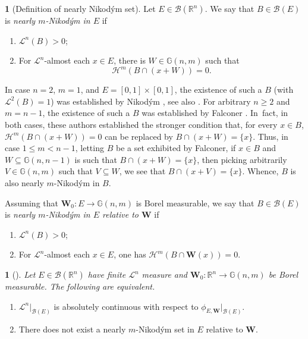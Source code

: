 \documentclass[11pt]{article}
\newcounter{cdrthm}[section]
\theoremstyle{definition}
\theoremstyle{jepanonymous}
\newtheorem{jepempty}[cdrthm]{}
\newenvironment{enonce}[2][remark]{\begin{jepempty}[#2]}{\end{jepempty}}
\theoremstyle{plain}
\newenvironment{Empty}[2][\null]{%
\begin{enonce}[remark]{#1}#2}
{\end{enonce}}
\newcommand{\R}{\mathbb{R}}
\newcommand{\Rn}{\R^n}
\newcommand{\calB}{\mathscr{B}}
\newcommand{\calH}{\mathscr{H}}
\newcommand{\calL}{\mathscr{L}}
\newcommand{\bW}{{\boldsymbol{W}}}
\newcommand{\bG}{\mathbb{G}}
\let\subset\subseteq
\begin{document}
\begin{Empty}[Definition of nearly Nikod\'ym set]
Let $E \in \calB(\Rn)$. We say that $B \in \calB(E)$ is \emph{nearly $m$-Nikod\'ym in $E$} if
\begin{enumerate}
\item $\calL^n(B) > 0$;
\item For $\calL^n$-almost each $x \in E$, there is $W \in \bG(n,m)$ such that
\[
\calH^m\left(B \cap (x+W) \right) = 0.
\]
\end{enumerate}
\par
In case $n=2$, $m=1$, and $E=[0,1] \times [0,1]$, the existence of such a $B$ (with $\calL^2(B)=1$) was established by Nikod\'ym \cite{NIK.27}, see also \cite[Chap.\,8]{GUZMAN.1981}.
For arbitrary $n \geq 2$ and $m=n-1$, the existence of such a $B$ was established by Falconer \cite{FAL.86}.
In~fact, in both cases, these authors established the stronger condition that, for every $x \in B$, $\calH^m(B \cap (x+W))=0$ can be replaced by $B \cap (x+W) = \{x\}$.
Thus, in case $1 \leq m< n-1$, letting $B$ be a set exhibited by Falconer, if $x \in B$ and $W \subset \bG(n,n-1)$ is such that $B \cap (x+W) = \{x\}$, then picking arbitrarily $V \in \bG(n,m)$ such that $V \subset W$, we see that $B \cap (x+V)=\{x\}$.
Whence, $B$ is also nearly $m$-Nikod\'ym in $B$.
\par
Assuming that $\bW_0: E \to \bG(n,m)$ is Borel measurable, we say that $B \in \calB(E)$ is \emph{nearly $m$-Nikod\'ym in $E$ relative to $\bW$} if
\begin{enumerate}
\item $\calL^n(B) > 0$;
\item For $\calL^n$-almost each $x \in E$, one has $\calH^m\left(B \cap \bW(x) \right) = 0$.
\end{enumerate}
\end{Empty}

\begin{Empty}[]
{\it
Let $E \in \calB(\Rn)$ have finite $\calL^n$ measure and $\bW_0: \Rn \to \bG(n,m)$ be Borel measurable. The following are equivalent.
\begin{enumerate}
\item\label{enum:18.1} $\calL^n |_{\calB(E)}$ is absolutely continuous with respect to $\phi_{E,\bW}|_{\calB(E)}$.
\item\label{enum:18.2} There does not exist a nearly $m$-Nikod\'ym set in $E$ relative to $\bW$.
\end{enumerate}
}
\end{Empty}
\end{document}
